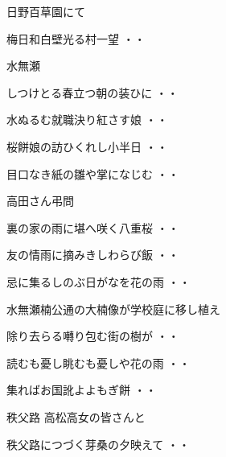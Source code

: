 日野百草園にて
\begin{shiika}梅日和白壁光る村一望
\hfill{・・}\end{shiika}
\vspace{0.6cm}
水無瀬
\begin{shiika}しつけとる春立つ朝の装ひに
\hfill{・・}\end{shiika}
\begin{shiika}水ぬるむ就職決り紅さす娘
\hfill{・・}\end{shiika}
\begin{shiika}桜餅娘の訪ひくれし小半日
\hfill{・・}\end{shiika}
\begin{shiika}目口なき紙の雛や掌になじむ
\hfill{・・}\end{shiika}
\vspace{0.6cm}
高田さん弔問
\begin{shiika}裏の家の雨に堪へ咲く八重桜
\hfill{・・}\end{shiika}
\begin{shiika}友の情雨に摘みきしわらび飯
\hfill{・・}\end{shiika}
\begin{shiika}忌に集るしのぶ日がなを花の雨
\hfill{・・}\end{shiika}
\vspace{0.6cm}
水無瀬楠公通の大楠像が学校庭に移し植え
\begin{shiika}除り去らる囀り包む街の樹が
\hfill{・・}\end{shiika}
\begin{shiika}読むも憂し眺むも憂しや花の雨
\hfill{・・}\end{shiika}
\begin{shiika}集ればお国訛よよもぎ餅
\hfill{・・}\end{shiika}
\vspace{0.6cm}
秩父路 高松高女の皆さんと
\begin{shiika}秩父路につづく芽桑の夕映えて
\hfill{・・}\end{shiika}
\vspace{0.6cm}
